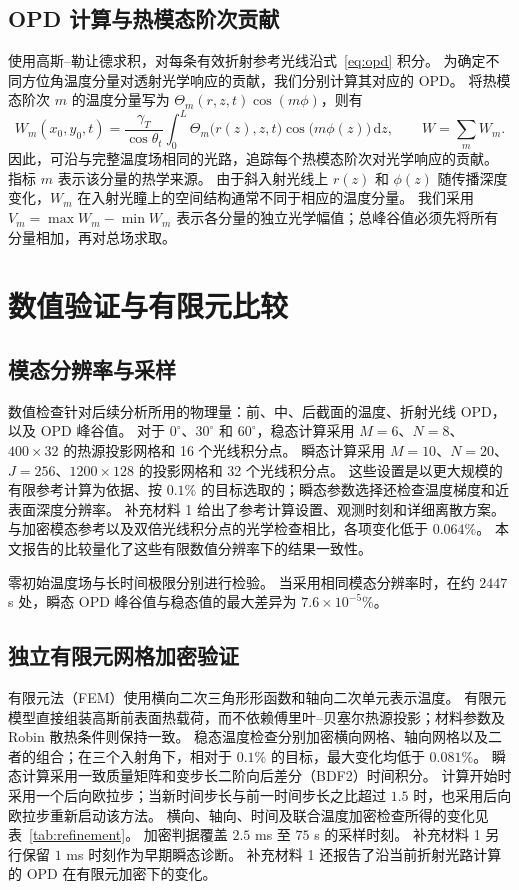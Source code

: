 \documentclass{optica-article}
\newcommand{\dd}{\,\mathrm{d}}
\begin{document}
\subsection{OPD 计算与热模态阶次贡献}\label{sec:thermal-order}
使用高斯--勒让德求积，对每条有效折射参考光线沿式~\eqref{eq:opd} 积分。
为确定不同方位角温度分量对透射光学响应的贡献，我们分别计算其对应的 OPD。
将热模态阶次 $m$ 的温度分量写为 $\Theta_m(r,z,t)\cos(m\phi)$，则有
\[
 W_m(x_0,y_0,t)=\frac{\gamma_T}{\cos\theta_t}
 \int_0^L\Theta_m\bigl(r(z),z,t\bigr)\cos\bigl(m\phi(z)\bigr)\dd z,
 \qquad W=\sum_m W_m.
\]
因此，可沿与完整温度场相同的光路，追踪每个热模态阶次对光学响应的贡献。
指标 $m$ 表示该分量的热学来源。
由于斜入射光线上 $r(z)$ 和 $\phi(z)$ 随传播深度变化，$W_m$ 在入射光瞳上的空间结构通常不同于相应的温度分量。
我们采用 $V_m=\max W_m-\min W_m$ 表示各分量的独立光学幅值；总峰谷值必须先将所有分量相加，再对总场求取。

\section{数值验证与有限元比较}
\subsection{模态分辨率与采样}
数值检查针对后续分析所用的物理量：前、中、后截面的温度、折射光线 OPD，以及 OPD 峰谷值。
对于 $0^\circ$、$30^\circ$ 和 $60^\circ$，稳态计算采用 $M=6$、$N=8$、$400\times32$ 的热源投影网格和 16 个光线积分点。
瞬态计算采用 $M=10$、$N=20$、$J=256$、$1200\times128$ 的投影网格和 32 个光线积分点。
这些设置是以更大规模的有限参考计算为依据、按 $0.1\%$ 的目标选取的；瞬态参数选择还检查温度梯度和近表面深度分辨率。
补充材料 1 给出了参考计算设置、观测时刻和详细离散方案。
与加密模态参考以及双倍光线积分点的光学检查相比，各项变化低于 $0.064\%$。
本文报告的比较量化了这些有限数值分辨率下的结果一致性。

零初始温度场与长时间极限分别进行检验。
当采用相同模态分辨率时，在约 $2447$ s 处，瞬态 OPD 峰谷值与稳态值的最大差异为 $7.6\times10^{-5}\%$。

\subsection{独立有限元网格加密验证}
有限元法（FEM）使用横向二次三角形形函数和轴向二次单元表示温度。
有限元模型直接组装高斯前表面热载荷，而不依赖傅里叶--贝塞尔热源投影；材料参数及 Robin 散热条件则保持一致。
稳态温度检查分别加密横向网格、轴向网格以及二者的组合；在三个入射角下，相对于 $0.1\%$ 的目标，最大变化均低于 $0.081\%$。
瞬态计算采用一致质量矩阵和变步长二阶向后差分（BDF2）时间积分。
计算开始时采用一个后向欧拉步；当新时间步长与前一时间步长之比超过 $1.5$ 时，也采用后向欧拉步重新启动该方法。
横向、轴向、时间及联合温度加密检查所得的变化见表~\ref{tab:refinement}。
加密判据覆盖 $2.5$ ms 至 $75$ s 的采样时刻。
补充材料 1 另行保留 $1$ ms 时刻作为早期瞬态诊断。
补充材料 1 还报告了沿当前折射光路计算的 OPD 在有限元加密下的变化。
\end{document}
